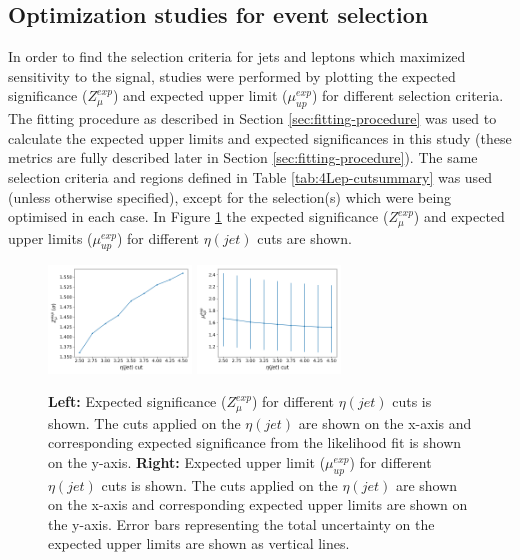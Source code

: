 \subsection{Optimization studies for event selection}
\label{sec:optimization-studies-tetra}
In order to find the selection criteria for jets and leptons which maximized sensitivity to the \tWZ signal, studies were performed by plotting the expected significance ($Z_{\mu}^{exp}$) and expected upper limit ($\mu_{up}^{exp}$) for different selection criteria. The fitting procedure as described in Section \ref{sec:fitting-procedure} was used to calculate the expected upper limits and expected significances in this study (these metrics are fully described later in Section \ref{sec:fitting-procedure}). The same selection criteria and regions defined in Table \ref{tab:4Lep-cutsummary} was used (unless otherwise specified), except for the selection(s) which were being optimised in each case. In Figure \ref{fig:4lep-jetEta-optimisation} the expected significance ($Z_{\mu}^{exp}$) and expected upper limits ($\mu_{up}^{exp}$) for different $\eta(jet)$ cuts are shown. 
\begin{figure}[h!]
	\includegraphics[width = 0.34\textwidth]{figures/signif_jetEta.png}
  	\includegraphics[width = 0.34\textwidth]{figures/exp_upper_jetEta.png}
  \centering
	\caption{\textbf{Left:} Expected significance ($Z_{\mu}^{exp}$) for different $\eta(jet)$ cuts is shown. The cuts applied on the $\eta(jet)$ are shown on the x-axis and corresponding expected significance from the likelihood fit is shown on the y-axis. \textbf{Right:} Expected upper limit ($\mu_{up}^{exp}$) for different $\eta(jet)$ cuts is shown. The cuts applied on the $\eta(jet)$ are shown on the x-axis and corresponding expected upper limits are shown on the y-axis. Error bars representing the total uncertainty on the expected upper limits are shown as vertical lines.}
	\label{fig:4lep-jetEta-optimisation}
\end{figure}


